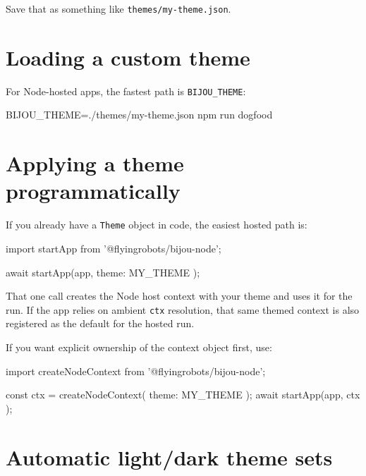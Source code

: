 Save that as something like \texttt{t\allowbreak{}h\allowbreak{}e\allowbreak{}m\allowbreak{}e\allowbreak{}s\allowbreak{}/\allowbreak{}m\allowbreak{}y\allowbreak{}-\allowbreak{}t\allowbreak{}h\allowbreak{}e\allowbreak{}m\allowbreak{}e\allowbreak{}.\allowbreak{}j\allowbreak{}s\allowbreak{}o\allowbreak{}n}.

\section{Loading a custom theme}\label{record-026-loading-a-custom-theme}

For Node-hosted apps, the fastest path is \texttt{B\allowbreak{}I\allowbreak{}J\allowbreak{}O\allowbreak{}U\allowbreak{}\_\allowbreak{}T\allowbreak{}H\allowbreak{}E\allowbreak{}M\allowbreak{}E}:

\begin{CodeBlock}
BIJOU_THEME=./themes/my-theme.json npm run dogfood
\end{CodeBlock}

\section{Applying a theme programmatically}\label{record-026-applying-a-theme-programmatically}

If you already have a \texttt{T\allowbreak{}h\allowbreak{}e\allowbreak{}m\allowbreak{}e} object in code, the easiest hosted path is:

\begin{CodeBlock}
import { startApp } from '@flyingrobots/bijou-node';

await startApp(app, { theme: MY_THEME });
\end{CodeBlock}

That one call creates the Node host context with your theme and uses it for the run. If the app relies on ambient \texttt{c\allowbreak{}t\allowbreak{}x} resolution, that same themed context is also registered as the default for the hosted run.

If you want explicit ownership of the context object first, use:

\begin{CodeBlock}
import { createNodeContext } from '@flyingrobots/bijou-node';

const ctx = createNodeContext({ theme: MY_THEME });
await startApp(app, { ctx });
\end{CodeBlock}

\section{Automatic light/dark theme sets}\label{record-026-automatic-lightdark-theme-sets}

